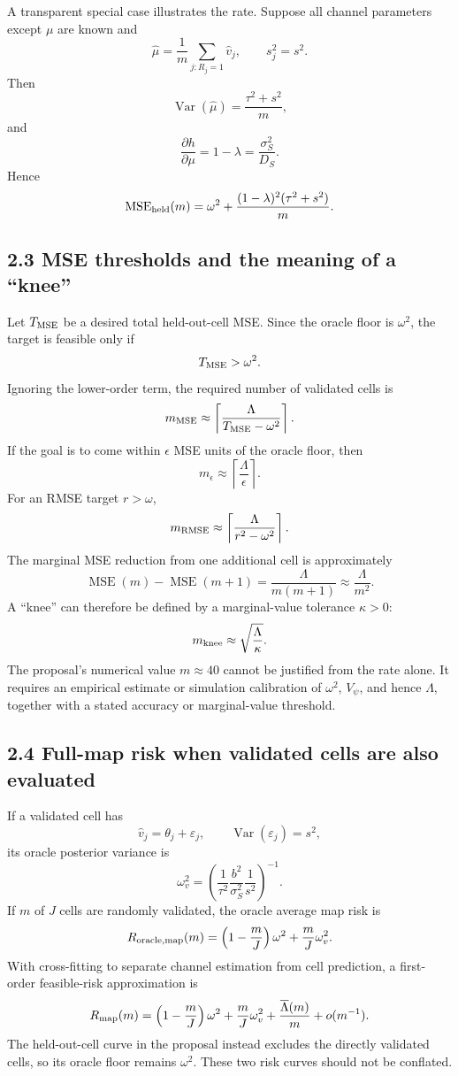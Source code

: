 \documentclass[11pt]{article}
\newcommand{\Var}{\operatorname{Var}}
\newcommand{\MSE}{\operatorname{MSE}}
\begin{document}
A transparent special case illustrates the rate. Suppose all channel
parameters except \(\mu\) are known and
\[
    \widehat\mu=\frac1m\sum_{j:R_j=1}\widehat v_j,
    \qquad
    s_j^2=s^2.
\]
Then
\[
    \Var(\widehat\mu)=\frac{\tau^2+s^2}{m},
\]
and
\[
    \frac{\partial h}{\partial\mu}
    =
    1-\lambda
    =
    \frac{\sigma_S^2}{D_S}.
\]
Hence
\[
    \MSE_{\rm held}(m)
    =
    \omega^2
    +
    \frac{(1-\lambda)^2(\tau^2+s^2)}{m}.
\]

\subsection*{2.3 MSE thresholds and the meaning of a ``knee''}

Let \(T_{\rm MSE}\) be a desired total held-out-cell MSE. Since the oracle floor
is \(\omega^2\), the target is feasible only if
\[
    T_{\rm MSE}>\omega^2.
\]
Ignoring the lower-order term, the required number of validated cells is
\[
    m_{\rm MSE}
    \approx
    \left\lceil
      \frac{\Lambda}{T_{\rm MSE}-\omega^2}
    \right\rceil.
\]
If the goal is to come within \(\epsilon\) MSE units of the oracle floor, then
\[
    m_\epsilon
    \approx
    \left\lceil\frac{\Lambda}{\epsilon}\right\rceil.
\]
For an RMSE target \(r>\omega\),
\[
    m_{\rm RMSE}
    \approx
    \left\lceil
      \frac{\Lambda}{r^2-\omega^2}
    \right\rceil.
\]
The marginal MSE reduction from one additional cell is approximately
\[
    \MSE(m)-\MSE(m+1)
    =
    \frac{\Lambda}{m(m+1)}
    \approx
    \frac{\Lambda}{m^2}.
\]
A ``knee'' can therefore be defined by a marginal-value tolerance
\(\kappa>0\):
\[
    m_{\rm knee}\approx\sqrt{\frac{\Lambda}{\kappa}}.
\]
The proposal's numerical value \(m\approx40\) cannot be justified from the
rate alone. It requires an empirical estimate or simulation calibration of
\(\omega^2\), \(V_\psi\), and hence \(\Lambda\), together with a stated
accuracy or marginal-value threshold.

\subsection*{2.4 Full-map risk when validated cells are also evaluated}

If a validated cell has
\[
    \widehat v_j=\theta_j+\varepsilon_j,
    \qquad
    \Var(\varepsilon_j)=s^2,
\]
its oracle posterior variance is
\[
    \omega_v^2
    =
    \left(
      \frac1{\tau^2}
      \frac{b^2}{\sigma_S^2}
      \frac1{s^2}
    \right)^{-1}.
\]
If \(m\) of \(J\) cells are randomly validated, the oracle average map risk is
\[
    R_{\rm oracle,map}(m)
    =
    \left(1-\frac mJ\right)\omega^2
    +
    \frac mJ\omega_v^2.
\]
With cross-fitting to separate channel estimation from cell prediction, a
first-order feasible-risk approximation is
\[
    R_{\rm map}(m)
    =
    \left(1-\frac mJ\right)\omega^2
    +
    \frac mJ\omega_v^2
    +
    \frac{\overline\Lambda(m)}{m}
    +
    o(m^{-1}).
\]
The held-out-cell curve in the proposal instead excludes the directly
validated cells, so its oracle floor remains \(\omega^2\). These two risk
curves should not be conflated.
\end{document}
